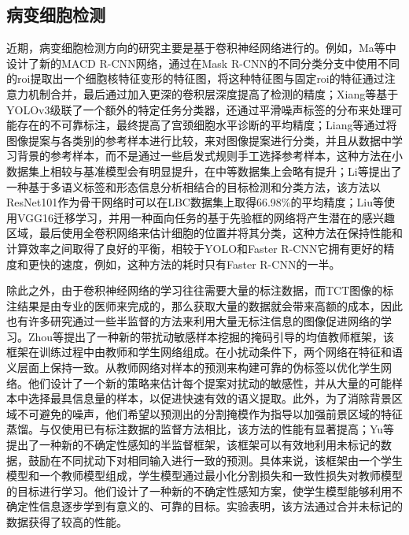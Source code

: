 \subsection{病变细胞检测}
\par 近期，病变细胞检测方向的研究主要是基于卷积神经网络进行的。例如，Ma等\cite{ma2020macd}中设计了新的MACD R-CNN网络，通过在Mask R-CNN的不同分类分支中使用不同的roi提取出一个细胞核特征变形的特征图，将这种特征图与固定roi的特征通过注意力机制合并，最后通过加入更深的卷积层深度提高了检测的精度；Xiang等\cite{xiang2020novel}基于YOLOv3级联了一个额外的特定任务分类器，还通过平滑噪声标签的分布来处理可能存在的不可靠标注，最终提高了宫颈细胞水平诊断的平均精度；Liang等\cite{liang2018comparison}通过将图像提案与各类别的参考样本进行比较，来对图像提案进行分类，并且从数据中学习背景的参考样本，而不是通过一些启发式规则手工选择参考样本，这种方法在小数据集上相较与基准模型会有明显提升，在中等数据集上会略有提升；Li等\cite{li2019detection}提出了一种基于多语义标签和形态信息分析相结合的目标检测和分类方法，该方法以ResNet101作为骨干网络时可以在LBC数据集上取得66.98\%的平均精度；Liu等\cite{liu2018multitask}使用VGG16迁移学习，并用一种面向任务的基于先验框的网络将产生潜在的感兴趣区域，最后使用全卷积网络来估计细胞的位置并将其分类，这种方法在保持性能和计算效率之间取得了良好的平衡，相较于YOLO和Faster R-CNN它拥有更好的精度和更快的速度，例如，这种方法的耗时只有Faster R-CNN的一半。
\par 除此之外，由于卷积神经网络的学习往往需要大量的标注数据，而TCT图像的标注结果是由专业的医师来完成的，那么获取大量的数据就会带来高额的成本，因此也有许多研究\cite{zhou2020deep}\cite{yu2019uncertainty}通过一些半监督的方法来利用大量无标注信息的图像促进网络的学习。Zhou等\cite{zhou2020deep}提出了一种新的带扰动敏感样本挖掘的掩码引导的均值教师框架，该框架在训练过程中由教师和学生网络组成。在小扰动条件下，两个网络在特征和语义层面上保持一致。从教师网络对样本的预测来构建可靠的伪标签以优化学生网络。他们设计了一个新的策略来估计每个提案对扰动的敏感性，并从大量的可能样本中选择最具信息量的样本，以促进快速有效的语义提取。此外，为了消除背景区域不可避免的噪声，他们希望以预测出的分割掩模作为指导以加强前景区域的特征蒸馏。与仅使用已有标注数据的监督方法相比，该方法的性能有显著提高；Yu等\cite{yu2019uncertainty}提出了一种新的不确定性感知的半监督框架，该框架可以有效地利用未标记的数据，鼓励在不同扰动下对相同输入进行一致的预测。具体来说，该框架由一个学生模型和一个教师模型组成，学生模型通过最小化分割损失和一致性损失对教师模型的目标进行学习。他们设计了一种新的不确定性感知方案，使学生模型能够利用不确定性信息逐步学到有意义的、可靠的目标。实验表明，该方法通过合并未标记的数据获得了较高的性能。

